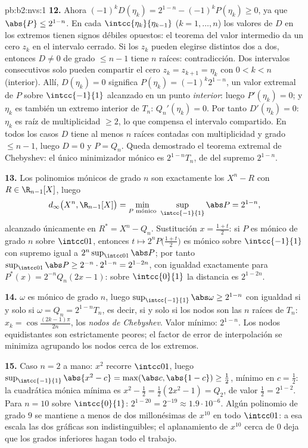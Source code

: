 \begin{solution}{pb:b2:nvs:1}
\textbf{12.} Ahora $(-1)^kD(\eta_k) = 2^{1-n} - (-1)^kP(\eta_k)
\geq 0$, ya que $\abs{P} \leq 2^{1-n}$. En cada
$\intcc{\eta_k}{\eta_{k-1}}$ ($k = 1, \dots, n$) los valores de
$D$ en los extremos tienen signos débiles opuestos: el teorema del
valor intermedio da un cero $z_k$ en el intervalo cerrado. Si los
$z_k$ pueden elegirse distintos dos a dos, entonces $D \neq 0$ de
grado $\leq n-1$ tiene $n$ raíces: contradicción. Dos intervalos
consecutivos solo pueden compartir el cero $z_k = z_{k+1} =
\eta_k$ con $0 < k < n$ (interior). Allí, $D(\eta_k) = 0$
significa $P(\eta_k) = (-1)^k2^{1-n}$, un valor extremal de $P$
sobre $\intcc{-1}{1}$ alcanzado en un punto \emph{interior}: luego
$P'(\eta_k) = 0$; y $\eta_k$ es también un extremo interior de
$T_n$: $Q_n'(\eta_k) = 0$. Por tanto $D'(\eta_k) = 0$: $\eta_k$ es
raíz de multiplicidad $\geq 2$, lo que compensa el intervalo
compartido. En todos los casos $D$ tiene al menos $n$ raíces
contadas con multiplicidad y grado $\leq n - 1$, luego $D = 0$ y
$P = Q_n$. Queda demostrado el teorema extremal de Chebyshev: el
único minimizador mónico es $2^{1-n}T_n$, de  del supremo
$2^{1-n}$.

\textbf{13.} Los polinomios mónicos de grado $n$ son exactamente
los $X^n - R$ con $R \in \R_{n-1}[X]$, luego
\[
d_\infty\bigl(X^n, \R_{n-1}[X]\bigr) = \min_{P \text{
mónico}}\ \sup_{\intcc{-1}{1}}\abs P = 2^{1-n},
\]
alcanzado únicamente en $R^* = X^n - Q_n$. Sustitución $x =
\frac{1+t}2$: si $P$ es mónico de grado $n$ sobre $\intcc01$,
entonces $t \mapsto 2^nP\bigl(\frac{1+t}2\bigr)$ es mónico sobre
$\intcc{-1}{1}$ con supremo igual a $2^n\sup_{\intcc01}\abs P$;
por tanto $\sup_{\intcc01}\abs P \geq 2^{-n}\cdot2^{1-n} =
2^{1-2n}$, con igualdad exactamente para $P^*(x) = 2^{-n}Q_n(2x -
1)$: sobre $\intcc{0}{1}$ la distancia es $2^{1-2n}$.

\textbf{14.} $\omega$ es mónico de grado $n$, luego
$\sup_{\intcc{-1}{1}}\abs\omega \geq 2^{1-n}$ con igualdad si y
solo si $\omega = Q_n = 2^{1-n}T_n$, es decir, si y solo si los
nodos son las $n$ raíces de $T_n$: $x_k =
\cos\frac{(2k-1)\pi}{2n}$, los \emph{nodos de Chebyshev}. Valor
mínimo: $2^{1-n}$. Los nodos equidistantes son estrictamente
peores; el factor de error de interpolación se minimiza agrupando
los nodos cerca de los extremos.

\textbf{15.} Caso $n = 2$ a mano: $x^2$ recorre $\intcc01$, luego
$\sup_{\intcc{-1}{1}}\abs{x^2 - c} = \max(\abs c, \abs{1 - c})
\geq \frac12$, mínimo en $c = \frac12$: la cuadrática mónica
mínima es $x^2 - \frac12 = \frac12(2x^2 - 1) = Q_2$, de valor
$\frac12 = 2^{1-2}$. Para $n = 10$ sobre $\intcc{0}{1}$: $2^{1-20}
= 2^{-19} \approx 1.9\cdot10^{-6}$. Algún polinomio de grado $9$
se mantiene a menos de dos millonésimas de $x^{10}$ en todo
$\intcc01$: a esa escala las dos gráficas son indistinguibles; el
aplanamiento de $x^{10}$ cerca de $0$ deja que los grados
inferiores hagan todo el trabajo.


\end{solution}
